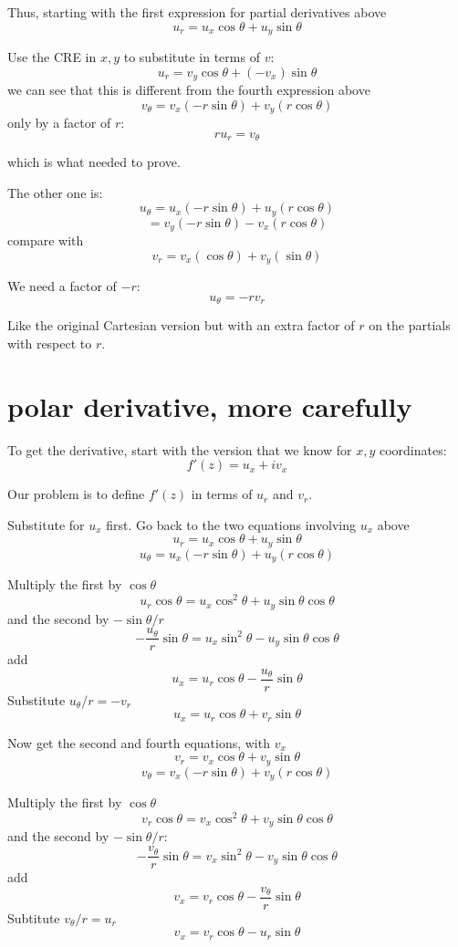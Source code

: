 \documentclass[11pt, oneside]{article}
\begin{document}
Thus, starting with the first expression for partial derivatives above
\[ u_r = u_x \cos \theta + u_y \sin \theta \]

Use the CRE in $x,y$ to substitute in terms of $v$:
\[ u_r = v_y \cos \theta + (-v_x) \sin \theta \]
we can see that this is different from the fourth expression above
\[ v_{\theta} = v_x (-r \sin \theta) + v_y (r \cos \theta) \]
only by a factor of $r$:
\[ r u_r = v_{\theta} \]

which is what needed to prove.

The other one is:
\[ u_{\theta} = u_x (-r \sin \theta) + u_y (r \cos \theta)  \]
\[ = v_y (-r \sin \theta) - v_x (r \cos \theta)  \]
compare with
\[ v_r =  v_x (\cos \theta) + v_y (\sin \theta)  \]

We need a factor of $-r$:
\[ u_{\theta} = -r v_r \]

Like the original Cartesian version but with an extra factor of $r$ on the partials with respect to $r$.

\section*{polar derivative, more carefully}

To get the derivative, start with the version that we know for $x,y$ coordinates:
\[ f'(z) = u_x + i v_x \]

Our problem is to define $f'(z)$ in terms of $u_r$ and $v_r$.

Substitute for $u_x$ first.  Go back to the two equations involving $u_x$ above
\[ u_r = u_x \cos \theta + u_y \sin \theta \]
\[ u_{\theta} = u_x (-r \sin \theta) + u_y (r \cos \theta) \]

Multiply the first by $\cos \theta$
\[ u_r \cos \theta = u_x \cos^2 \theta + u_y \sin \theta \cos \theta \]
 and the second by $- \sin \theta/r$
\[ - \frac{u_{\theta}}{r} \sin \theta = u_x  \sin^2 \theta - u_y \sin \theta \cos \theta \]
add
\[ u_x = u_r \cos \theta - \frac{u_{\theta}}{r} \sin \theta \]
Substitute $u_{\theta}/r = - v_r$
\[ u_x = u_r \cos \theta + v_r \sin \theta \]

Now get the second and fourth equations, with $v_x$
\[ v_r = v_x \cos \theta + v_y \sin \theta \]
\[ v_{\theta} = v_x (-r \sin \theta) + v_y (r \cos \theta) \]

Multiply the first by $\cos \theta$
\[ v_r \cos \theta = v_x \cos^2 \theta + v_y \sin \theta \cos \theta \]
and the second by $-\sin \theta / r$:
\[ -\frac{v_{\theta}}{r} \sin \theta = v_x \sin^2 \theta - v_y \sin \theta \cos \theta \]
add
\[ v_x = v_r \cos \theta -\frac{v_{\theta}}{r} \sin \theta \]
Subtitute $v_{\theta}/r = u_r$
\[ v_x = v_r \cos \theta - u_r \sin \theta \]
\end{document}
